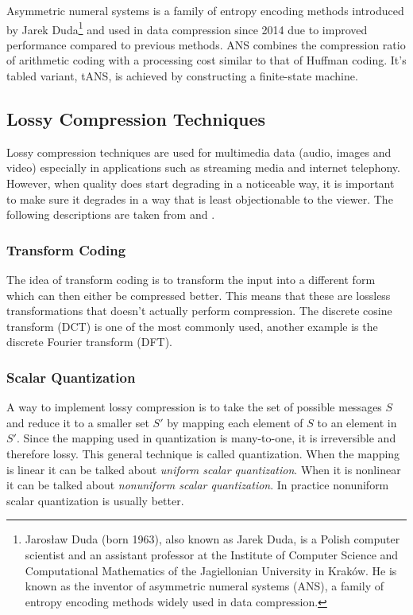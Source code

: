 \documentclass[12pt, a4paper]{report}
\begin{document}
Asymmetric numeral systems is a family of entropy encoding methods introduced by Jarek Duda\footnote{Jarosław Duda (born 1963),
also known as Jarek Duda, is a Polish computer scientist and an assistant professor at the Institute of Computer Science and
Computational Mathematics of the Jagiellonian University in Kraków. He is known as the inventor of asymmetric numeral systems
(ANS), a family of entropy encoding methods widely used in data compression.} and used in data compression since 2014 due to
improved performance compared to previous methods.
ANS combines the compression ratio of arithmetic coding with a processing cost similar to that of Huffman coding.
It's tabled variant, tANS, is achieved by constructing a finite-state machine.

\subsection{Lossy Compression Techniques}

Lossy compression techniques are used for multimedia data (audio, images and video) especially in applications such as streaming
media and internet telephony.
However, when quality does start degrading in a noticeable way, it is important to make sure it degrades in a way that is least
objectionable to the viewer.
The following descriptions are taken from \cite{IntroductionToDataCompression} and \cite{TheDataCompressionBook2ndEdition}.

\subsubsection{Transform Coding}

The idea of transform coding is to transform the input into a different form which can then either be compressed better.
This means that these are lossless transformations that doesn't actually perform compression.
The discrete cosine transform (DCT) is one of the most commonly used, another example is the discrete Fourier transform (DFT).

\subsubsection{Scalar Quantization}

A way to implement lossy compression is to take the set of possible messages \(S\) and reduce it to a smaller set \(S'\) by
mapping each element of \(S\) to an element in \(S'\).
Since the mapping used in quantization is many-to-one, it is irreversible and therefore lossy.
This general technique is called quantization.
When the mapping is linear it can be talked about \textit{uniform scalar quantization}.
When it is nonlinear it can be talked about \textit{nonuniform scalar quantization}.
In practice nonuniform scalar quantization is usually better.
\end{document}
